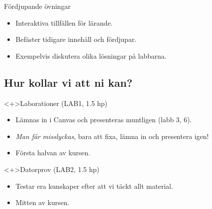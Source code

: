 \begin{frame}
  \begin{block}{Fördjupande övningar}
    \begin{itemize}
      \item Interaktiva tillfällen för lärande.
      \item Befäster tidigare innehåll och fördjupar.
      \item Exempelvis diskutera olika lösningar på labbarna.
    \end{itemize}
  \end{block}
\end{frame}


\subsection{Hur kollar vi att ni kan?}

\begin{frame}
  \begin{block}<+>{Laborationer (LAB1, 1.5 hp)}
    \begin{itemize}
      \item Lämnas in i Canvas och presenteras muntligen (labb 3, 6).
      \item \emph{Man får misslyckas}, bara att fixa, lämna in och presentera 
        igen!
      \item Första halvan av kursen.
    \end{itemize}
  \end{block}

  \begin{block}<+>{Datorprov (LAB2, 1.5 hp)}
    \begin{itemize}
      \item Testar era kunskaper efter att vi täckt allt material.
      \item Mitten av kursen.
    \end{itemize}
  \end{block}
\end{frame}


